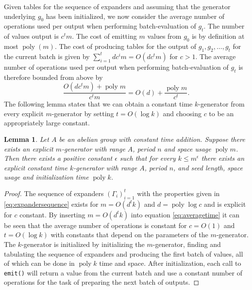 \documentclass[a4paper,11pt]{article}
\theoremstyle{plain}
\newtheorem{lemma}{Lemma}
\theoremstyle{definition}
\DeclareMathOperator{\poly}{poly}
\begin{document}
Given tables for the sequence of expanders and assuming that the generator underlying $g_{0}$ has been initialized, we now consider the average number of operations used per output when performing batch-evaluation of $g_{t}$.
The number of values output is $c^{t}m$.
The cost of emitting $m$ values from $g_{0}$ is by definition at most $\poly(m)$.
The cost of producing tables for the output of $g_{1}, g_{2}, \dots, g_{t}$ for the current batch is given by $\sum_{i=1}^{t}dc^{i}m = O(dc^{t}m)$ for $c > 1$.
The average number of operations used per output when performing batch-evaluation of $g_{t}$ is therefore bounded from above by
\begin{equation}
\frac{O(dc^{t}m) + \poly m}{c^{t}m} = O(d) + \frac{\poly m}{c^{t}}. \label{eq:averagetime}
\end{equation}
The following lemma states that we can obtain a constant time $k$-generator from every explicit $m$-generator by setting $t = O(\log k)$ and choosing $c$ to be an appropriately large constant.  
\begin{lemma} \label{lem:general}
Let $A$ be an abelian group with constant time addition. 
Suppose there exists an explicit $m$-generator with range $A$, period $n$ and space usage $\poly m$.
Then there exists a positive constant $\epsilon$ such that for every $k \leq m^{\epsilon}$ 
there exists an explicit constant time $k$-generator with range $A$, period $n$, and seed length, space usage and initialization time $\poly k$.
\end{lemma}
\begin{proof}
The sequence of expanders $\left(\Gamma_{i}\right)^{t}_{i = 1}$ with the properties given in \eqref{eq:expandersequence} exists for $m = O(d^{t}k)$ and $d = \poly \log c$ and is explicit for $c$ constant.
By inserting $m = O(d^{t}k)$ into equation \eqref{eq:averagetime} it can be seen that the average number of operations is constant for $c = O(1)$ and $t = O(\log k)$ with constants that depend on the parameters of the $m$-generator. 
The $k$-generator is initialized by initializing the $m$-generator, finding and tabulating the sequence of expanders and producing the first batch of values, all of which can be done in $\poly k$ time and space.
After initialization, each call to \texttt{emit()} will return a value from the current batch and use a constant number of operations for the task of preparing the next batch of outputs.    
\end{proof}
\end{document}
